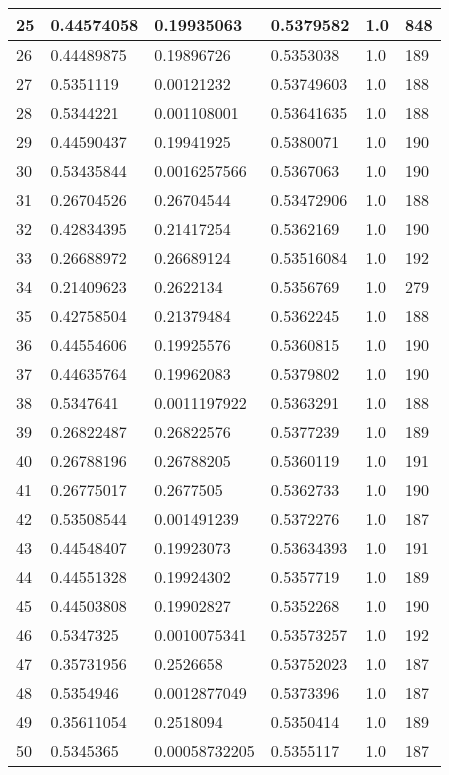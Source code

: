 \begin{longtable}{|l|l|l|l|l|l|}
25 & 0.44574058 & 0.19935063 & 0.5379582 & 1.0 & 848 \\ \hline 
26 & 0.44489875 & 0.19896726 & 0.5353038 & 1.0 & 189 \\ \hline 
27 & 0.5351119 & 0.00121232 & 0.53749603 & 1.0 & 188 \\ \hline 
28 & 0.5344221 & 0.001108001 & 0.53641635 & 1.0 & 188 \\ \hline 
29 & 0.44590437 & 0.19941925 & 0.5380071 & 1.0 & 190 \\ \hline 
30 & 0.53435844 & 0.0016257566 & 0.5367063 & 1.0 & 190 \\ \hline 
31 & 0.26704526 & 0.26704544 & 0.53472906 & 1.0 & 188 \\ \hline 
32 & 0.42834395 & 0.21417254 & 0.5362169 & 1.0 & 190 \\ \hline 
33 & 0.26688972 & 0.26689124 & 0.53516084 & 1.0 & 192 \\ \hline 
34 & 0.21409623 & 0.2622134 & 0.5356769 & 1.0 & 279 \\ \hline 
35 & 0.42758504 & 0.21379484 & 0.5362245 & 1.0 & 188 \\ \hline 
36 & 0.44554606 & 0.19925576 & 0.5360815 & 1.0 & 190 \\ \hline 
37 & 0.44635764 & 0.19962083 & 0.5379802 & 1.0 & 190 \\ \hline 
38 & 0.5347641 & 0.0011197922 & 0.5363291 & 1.0 & 188 \\ \hline 
39 & 0.26822487 & 0.26822576 & 0.5377239 & 1.0 & 189 \\ \hline 
40 & 0.26788196 & 0.26788205 & 0.5360119 & 1.0 & 191 \\ \hline 
41 & 0.26775017 & 0.2677505 & 0.5362733 & 1.0 & 190 \\ \hline 
42 & 0.53508544 & 0.001491239 & 0.5372276 & 1.0 & 187 \\ \hline 
43 & 0.44548407 & 0.19923073 & 0.53634393 & 1.0 & 191 \\ \hline 
44 & 0.44551328 & 0.19924302 & 0.5357719 & 1.0 & 189 \\ \hline 
45 & 0.44503808 & 0.19902827 & 0.5352268 & 1.0 & 190 \\ \hline 
46 & 0.5347325 & 0.0010075341 & 0.53573257 & 1.0 & 192 \\ \hline 
47 & 0.35731956 & 0.2526658 & 0.53752023 & 1.0 & 187 \\ \hline 
48 & 0.5354946 & 0.0012877049 & 0.5373396 & 1.0 & 187 \\ \hline 
49 & 0.35611054 & 0.2518094 & 0.5350414 & 1.0 & 189 \\ \hline 
50 & 0.5345365 & 0.00058732205 & 0.5355117 & 1.0 & 187 \\ \hline 
\end{longtable}